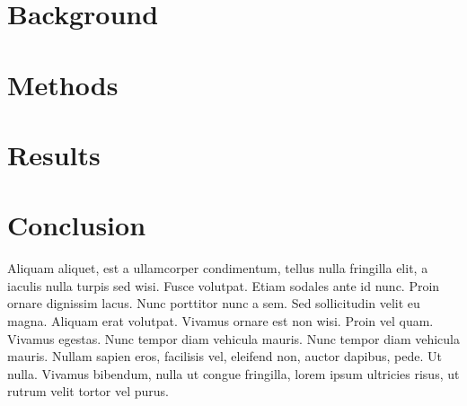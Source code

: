 \documentclass[11pt]{article}
\begin{document}
\section{Background}

\section{Methods}\label{sec:methods}



\section{Results}\label{sec:results}



\section{Conclusion}
\label{sec:conclusion}
\vspace{-0.2in}
%
Aliquam aliquet, est a ullamcorper condimentum, tellus nulla fringilla elit, a iaculis nulla turpis sed wisi. Fusce volutpat. Etiam sodales ante id nunc. Proin ornare dignissim lacus. Nunc porttitor nunc a sem. Sed sollicitudin velit eu magna. Aliquam erat volutpat. Vivamus ornare est non wisi. Proin vel quam. Vivamus egestas. Nunc tempor diam vehicula mauris. Nunc tempor diam vehicula mauris. Nullam sapien eros, facilisis vel, eleifend non, auctor dapibus, pede. Ut nulla. Vivamus bibendum, nulla ut congue fringilla, lorem ipsum ultricies risus, ut rutrum velit tortor vel purus.
\end{document}
